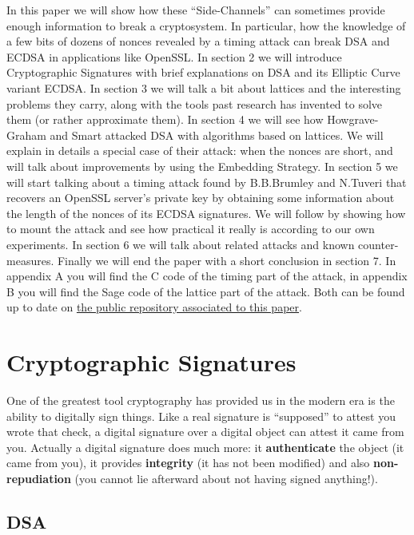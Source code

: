 \documentclass[a4paper,11pt]{article}
\begin{document}
In this paper we will show how these ``Side-Channels'' can sometimes provide enough information to break a cryptosystem. In particular, how the knowledge of a few bits of dozens of nonces revealed by a timing attack can break DSA and ECDSA in applications like OpenSSL. In section 2 we will introduce Cryptographic Signatures with brief explanations on DSA and its Elliptic Curve variant ECDSA. In section 3 we will talk a bit about lattices and the interesting problems they carry, along with the tools past research has invented to solve them (or rather approximate them). In section 4 we will see how Howgrave-Graham and Smart attacked DSA with algorithms based on lattices. We will explain in details a special case of their attack: when the nonces are short, and will talk about improvements by using the Embedding Strategy. In section 5 we will start talking about a timing attack found by B.B.Brumley and N.Tuveri that recovers an OpenSSL server's private key by obtaining some information about the length of the nonces of its ECDSA signatures. We will follow by showing how to mount the attack and see how practical it really is according to our own experiments. In section 6 we will talk about related attacks and known counter-measures. Finally we will end the paper with a short conclusion in section 7. In appendix A you will find the C code of the timing part of the attack, in appendix B you will find the Sage code of the lattice part of the attack. Both can be found up to date on \href{https://github.com/mimoo/timing_attack_ecdsa_tls}{the public repository associated to this paper}.

\section{Cryptographic Signatures}\label{rsa}


One of the greatest tool cryptography has provided us in the modern era is the ability to digitally sign things. Like a real signature is ``supposed'' to attest you wrote that check, a digital signature over a digital object can attest it came from you. Actually a digital signature does much more: it \textbf{authenticate} the object (it came from you), it provides \textbf{integrity} (it has not been modified) and also \textbf{non-repudiation} (you cannot lie afterward about not having signed anything!).

\subsection{DSA}\label{dsa}
\end{document}
